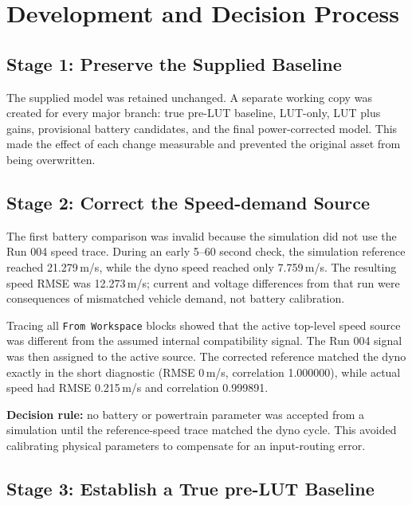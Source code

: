 \documentclass[11pt,letterpaper]{article}
\newcommand{\SI}[2]{#1\,#2}
\begin{document}
\section{Development and Decision Process}

\subsection{Stage 1: Preserve the Supplied Baseline}

The supplied model was retained unchanged. A separate working copy was created
for every major branch: true pre-LUT baseline, LUT-only, LUT plus gains,
provisional battery candidates, and the final power-corrected model. This made
the effect of each change measurable and prevented the original asset from
being overwritten.

\subsection{Stage 2: Correct the Speed-demand Source}

The first battery comparison was invalid because the simulation did not use the
Run 004 speed trace. During an early 5--60 second check, the simulation
reference reached \SI{21.279}{m/s}, while the dyno speed reached only
\SI{7.759}{m/s}. The resulting speed RMSE was \SI{12.273}{m/s}; current and
voltage differences from that run were consequences of mismatched vehicle
demand, not battery calibration.

Tracing all \texttt{From Workspace} blocks showed that the active top-level
speed source was different from the assumed internal compatibility signal. The
Run 004 signal was then assigned to the active source. The corrected reference
matched the dyno exactly in the short diagnostic (RMSE \SI{0}{m/s}, correlation
1.000000), while actual speed had RMSE \SI{0.215}{m/s} and correlation 0.999891.

\begin{decisionbox}
\textbf{Decision rule:} no battery or powertrain parameter was accepted from a
simulation until the reference-speed trace matched the dyno cycle. This avoided
calibrating physical parameters to compensate for an input-routing error.
\end{decisionbox}

\subsection{Stage 3: Establish a True pre-LUT Baseline}
\end{document}
